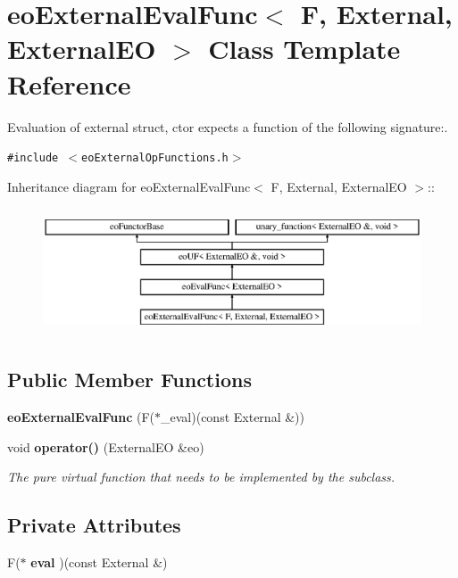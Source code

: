 \section{eo\-External\-Eval\-Func$<$ F, External, External\-EO $>$ Class Template Reference}
\label{classeo_external_eval_func}
Evaluation of external struct, ctor expects a function of the following signature:.  


{\tt \#include $<$eo\-External\-Op\-Functions.h$>$}

Inheritance diagram for eo\-External\-Eval\-Func$<$ F, External, External\-EO $>$::\begin{figure}[H]
\begin{center}
\leavevmode
\includegraphics[height=3.80952cm]{classeo_external_eval_func}
\end{center}
\end{figure}
\subsection*{Public Member Functions}
\begin{CompactItemize}
\item 
{\bf eo\-External\-Eval\-Func} (F($\ast$\_\-eval)(const External \&))\label{classeo_external_eval_func_a0}

\item 
void {\bf operator()} (External\-EO \&eo)\label{classeo_external_eval_func_a1}

\begin{CompactList}\small\item\em The pure virtual function that needs to be implemented by the subclass. \item\end{CompactList}\end{CompactItemize}
\subsection*{Private Attributes}
\begin{CompactItemize}
\item 
F($\ast$ {\bf eval} )(const External \&)\label{classeo_external_eval_func_r0}

\end{CompactItemize}


